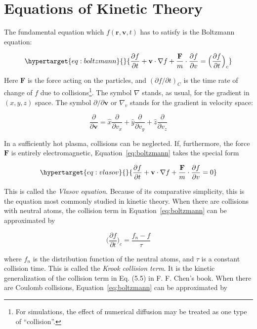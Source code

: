 \documentclass[
  notoc %
]{tufte-book}
\begin{document}
\hypertarget{equations-of-kinetic-theory}{%
\section{Equations of Kinetic
Theory}\label{equations-of-kinetic-theory}}

The fundamental equation which \(f(\mathbf{r}, \mathbf{v}, t)\) has to
satisfy is the Boltzmann equation:

\begin{equation}\protect\hypertarget{eq:boltzmann}{}{
\frac{\partial f}{\partial t} + \mathbf{v}\cdot\nabla f +\frac{\mathbf{F}}{m}\cdot\frac{\partial f}{\partial v} = \Big( \frac{\partial f}{\partial t} \Big)_c
}\label{eq:boltzmann}\end{equation}

Here \(\mathbf{F}\) is the force acting on the particles, and
\((\partial f/\partial t)_C\) is the time rate of change of \(f\) due to
collisions\footnote{For simulations, the effect of numerical diffusion
  may be treated as one type of ``collision''.}. The symbol \(\nabla\)
stands, as usual, for the gradient in \((x, y, z)\) space. The symbol
\(\partial/\partial\mathbf{v}\) or \(\nabla_v\) stands for the gradient
in velocity space:

\[
\frac{\partial}{\partial \mathbf{v}} = \hat{x}\frac{\partial}{\partial v_x} + \hat{y}\frac{\partial}{\partial v_y} + \hat{z}\frac{\partial}{\partial v_z}
\]

In a sufficiently hot plasma, collisions can be neglected. If,
furthermore, the force \(\mathbf{F}\) is entirely electromagnetic,
Equation~\ref{eq:boltzmann} takes the special form

\begin{equation}\protect\hypertarget{eq:vlasov}{}{
\frac{\partial f}{\partial t} + \mathbf{v}\cdot\nabla f +\frac{\mathbf{F}}{m}\cdot\frac{\partial f}{\partial v} = 0
}\label{eq:vlasov}\end{equation}

This is called the \emph{Vlasov equation}. Because of its comparative
simplicity, this is the equation most commonly studied in kinetic
theory. When there are collisions with neutral atoms, the collision term
in Equation~\ref{eq:boltzmann} can be approximated by

\[
\Big( \frac{\partial f}{\partial t} \Big)_c = \frac{f_n - f}{\tau}
\]

where \(f_n\) is the distribution function of the neutral atoms, and
\(\tau\) is a constant collision time. This is called the \emph{Krook
collision term}. It is the kinetic generalization of the collision term
in Eq. (5.5) in F. F. Chen's book. When there are Coulomb collisions,
Equation~\ref{eq:boltzmann} can be approximated by
\end{document}
